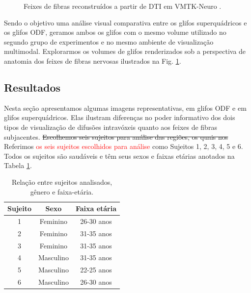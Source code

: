 \begin{figure}[H]
{    \label{fig::tratos_4}
    }
    \caption{Feixes de fibras reconstruídos a partir de DTI em VMTK-Neuro \cite{VMTKNeuro}.}
    \label{fig::tratos}
\end{figure}




Sendo o objetivo uma análise visual comparativa entre os glifos superquádricos \cite{Kindlmann2004} e os glifos ODF, geramos ambos os glifos com o mesmo volume utilizado no segundo grupo de experimentos e no mesmo ambiente de visualização multimodal.
Explorarmos os volumes de glifos renderizados sob a perspectiva de anatomia dos feixes de fibras nervosas ilustrados na Fig. \ref{fig::tratos}.


\subsection{Resultados}
\label{ssec::visual_resultados}

Nesta seção apresentamos algumas imagens representativas, em glifos ODF e em glifos superquádricos. Elas ilustram diferenças no poder informativo dos dois tipos de visualização de difusões intravóxeis quanto aos feixes de fibras subjacentes. \sout{Escolhemos seis sujeitos para análise das regiões, os quais nos} Referimos \textcolor{red}{os seis sujeitos escolhidos para análise} como Sujeitos 1, 2, 3, 4, 5 e 6. Todos os sujeitos são saudáveis e têm seus sexos e faixas etárias anotados na Tabela \ref{tab::vol_id}. 

\begin{table}[htb]
\centering
\begin{tabular}{|c|c|c|}
\hline
\textbf{Sujeito} & \textbf{Sexo} & \textbf{Faixa etária} \\ \hline
1                & Feminino      & 26-30 anos            \\ \hline
2                & Feminino      & 31-35 anos            \\ \hline
3                & Feminino      & 31-35 anos            \\ \hline
4                & Masculino     & 31-35 anos            \\ \hline
5                & Masculino     & 22-25 anos            \\ \hline
6                & Masculino     & 26-30 anos            \\ \hline
\end{tabular}
\caption{Relação entre sujeitos analisados, gênero e faixa-etária.}
\label{tab::vol_id}
\end{table}

